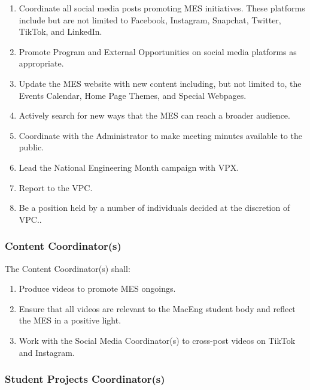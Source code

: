 \begin{enumerate}
 \item
  Coordinate all social media posts promoting MES initiatives. These platforms include but are not limited to Facebook, Instagram, Snapchat, Twitter, TikTok, and LinkedIn.
 \item
  Promote Program and External Opportunities on social media platforms as appropriate.
 \item
  Update the MES website with new content including, but not limited to, the Events Calendar, Home Page Themes, and Special Webpages.
 \item
  Actively search for new ways that the MES can reach a broader audience.
 \item
  Coordinate with the Administrator to make meeting minutes available to the public.
 \item
  Lead the National Engineering Month campaign with VPX.
 \item
  Report to the VPC.
 \item
  Be a position held by a number of individuals decided at the discretion of VPC..

\end{enumerate}

\subsubsection{Content Coordinator(s)}
\label{content-coordinators}
The Content Coordinator(s) shall:

\begin{enumerate}
  \item Produce videos to promote MES ongoings.
  \item Ensure that all videos are relevant to the MacEng student body and reflect the MES in a positive light.
  \item Work with the Social Media Coordinator(s) to cross-post videos on TikTok and Instagram.
\end{enumerate}

\subsubsection{Student Projects Coordinator(s)}
\label{special-projects-coordinators}

